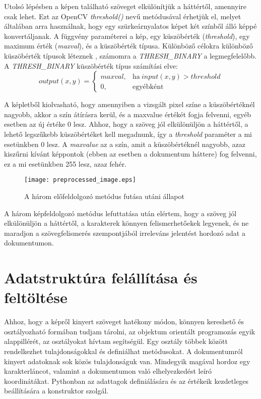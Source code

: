 \documentclass[12pt]{report}
\begin{document}
\noindent
Utolsó lépésben a képen található szöveget elkülönítjük a háttértől, amennyire csak lehet. Ezt az OpenCV \emph{threshold()} nevű metódusával érhetjük el, melyet általában arra használnak, hogy egy szürkeárnyalatos képet két színből álló képpé konvertáljanak. A függvény paraméterei a kép, egy küszöbérték (\emph{threshold}), egy maximum érték (\emph{maxval}), és a küszöbérték típusa.
Különböző célokra különböző küszöbérték típusok léteznek \cite{opencv_threshold}, számomra a \emph{THRESH\_BINARY} a legmegfelelőbb.
A \emph{THRESH\_BINARY} küszöbérték típus számítási elve:
\begin{equation}
output(x,y)=
    \begin{cases}
        maxval, & \text{ha}\ input(x,y)>threshold \\
        0, & \text{egyébként}
    \end{cases}
\end{equation}

\noindent
A képletből kiolvasható, hogy amennyiben a vizsgált pixel színe a küszöbértéknél nagyobb, akkor a szín átírásra kerül, és a maxvalue értékét fogja felvenni, egyéb esetben az új értéke 0 lesz.
Ahhoz, hogy a szöveg jól elkülönüljön a háttértől, a lehető legszűkebb küszöbértéket kell megadnunk, így a \emph{threshold} paraméter a mi esetünkben 0 lesz. A \emph{maxvalue} az a szín, amit a küszöbértéknél nagyobb, azaz kiszűrni kívánt képpontok (ebben az esetben a dokumentum háttere) fog felvenni, ez a mi esetünkben 255 lesz, azaz fehér.

\begin{figure}[h]
    \centerline{\texttt{[image: preprocessed\_image.eps]}}
    \caption{A három előfeldolgozó metódus futása utáni állapot}
\end{figure}

\noindent
A három képfeldolgozó metódus lefuttatása után elértem, hogy a szöveg jól elkülönüljön a háttértől, a karakterek könnyen felismerhetőekek legyenek, és ne maradjon a szövegfelismerés szempontjából irreleváns jelentést hordozó adat a dokumentumon.

\section{Adatstruktúra felállítása és feltöltése}

Ahhoz, hogy a képről kinyert szöveget hatékony módon, könnyen kereshető és osztályozható formában tudjam tárolni, az objektum orientált programozás egyik alappillérét, az osztályokat hívtam segítségül. Egy osztály többek között rendelkezhet tulajdonságokkal és definiálhat metódusokat. A dokumentumról kinyert adatoknak sok közös tulajdonságuk van. Mindegyik magával hordoz egy karakterláncot, valamint a dokumentumon való elhelyezkedést leíró koordinátákat. Pythonban az adattagok definiálására és az értékeik kezdetleges beállítására a konstruktor szolgál.
\end{document}
